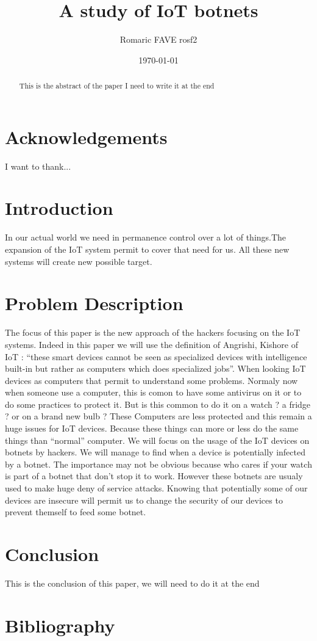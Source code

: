 \documentclass{report}
\date{\monthyeardate\today}
\begin{document}
\title{A study of IoT botnets}
\author{Romaric FAVE rosf2}

\maketitle

\tableofcontents

\hypersetup{pageanchor=false}
\begin{abstract}
  This is the abstract of the paper I need to write it at the end
\end{abstract}
\hypersetup{pageanchor=true}

\chapter*{Acknowledgements}
I want to thank...


\chapter{Introduction}
In our actual world we need in permanence control over a lot of things.The expansion of the IoT system permit to cover that need for us. All these new systems will create new possible target. 


\chapter{Problem Description}
The focus of this paper is the new approach of the hackers focusing on the IoT systems. Indeed in this paper we will use the definition of Angrishi, Kishore\autocite{angrishi2017turning} of IoT : ``these smart devices cannot be seen as specialized devices with intelligence built-in but rather as computers which does specialized jobs''. When looking IoT devices as computers that permit to understand some problems. Normaly now when someone use a computer, this is comon to have some antivirus on it or to do some practices to protect it. But is this common to do it on a watch ? a fridge ? or on a brand new bulb ? These Computers are less protected and this remain a huge issues for IoT devices\autocite{yang2017survey}. Because these things can more or less do the same things than ``normal'' computer. We will focus on the usage of the IoT devices on botnets by hackers. We will manage to find when a device is potentially infected by a botnet. The importance may not be obvious because who cares if your watch is part of a botnet that don't stop it to work. However these botnets are usualy used to make huge deny of service attacks\autocite{hallman2017ioddos}. Knowing that potentially some of our devices are insecure will permit us to change the security of our devices to prevent themself to feed some botnet.

\chapter{Conclusion}
This is the conclusion of this paper, we will need to do it at the end

\chapter*{Bibliography}
\printbibliography
\end{document}
